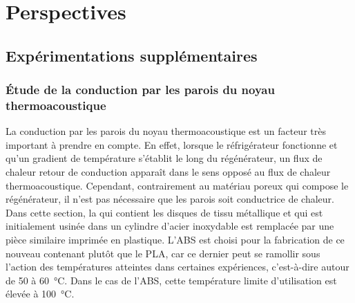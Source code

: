 \chapter{Perspectives}\label{chap:Persp}%
\mylocaltoc




\section{Expérimentations supplémentaires}

\subsection{\'Etude de la conduction par les parois du noyau thermoacoustique}
La conduction par les parois du noyau thermoacoustique est un facteur très important à prendre en compte. En effet, lorsque le réfrigérateur fonctionne et qu'un gradient de température s'établit le long du régénérateur, un flux de chaleur \og retour \fg{} de conduction apparaît dans le sens opposé au flux de chaleur thermoacoustique. Cependant, contrairement au matériau poreux qui compose le régénérateur, il n'est pas nécessaire que les parois soit conductrice de chaleur. Dans cette section, la  qui contient les disques de tissu métallique et qui est initialement usinée dans un cylindre d'acier inoxydable est remplacée par une pièce similaire imprimée en plastique. L'ABS est choisi pour la fabrication de ce nouveau contenant plutôt que le PLA, car ce dernier peut se ramollir sous l'action des températures atteintes dans certaines expériences, c'est-à-dire autour de \num{50} à \qty{60}{\degreeCelsius}. Dans le cas de l'ABS, cette température limite d'utilisation est élevée à \qty{100}{\degreeCelsius}.



